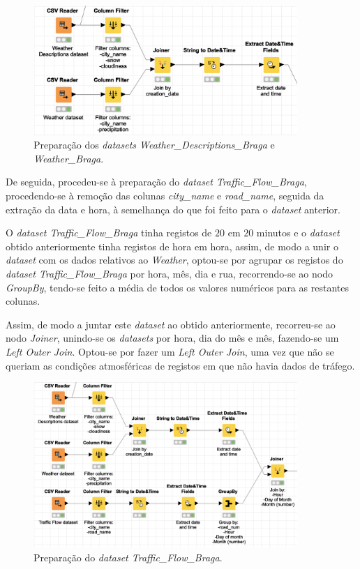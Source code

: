 \documentclass[a4paper, 12pt]{article}
\begin{document}
\begin{figure}[H]
	\centering
	\includegraphics[width=10cm]{weather}
	\caption{Preparação dos \textit{datasets Weather\_Descriptions\_Braga} e \textit{Weather\_Braga}.}
\end{figure}

De seguida, procedeu-se à preparação do \textit{dataset Traffic\_Flow\_Braga}, procedendo-se à remoção das colunas \textit{city\_name} e \textit{road\_name}, seguida da extração da data e hora, à semelhança do que foi feito para o \textit{dataset} anterior.

O \textit{dataset Traffic\_Flow\_Braga} tinha registos de $20$ em $20$ minutos e o \textit{dataset} obtido anteriormente tinha registos de hora em hora, assim, de modo a unir o \textit{dataset} com os dados relativos ao \textit{Weather}, optou-se por agrupar os registos do \textit{dataset Traffic\_Flow\_Braga} por hora, mês, dia e rua, recorrendo-se ao nodo \textit{GroupBy}, tendo-se feito a média de todos os valores numéricos para as restantes colunas.

Assim, de modo a juntar este \textit{dataset} ao obtido anteriormente, recorreu-se ao nodo \textit{Joiner}, unindo-se os \textit{datasets} por hora, dia do mês e mês, fazendo-se um \textit{Left Outer Join}. Optou-se por fazer um \textit{Left Outer Join}, uma vez que não se queriam as condições atmosféricas de registos em que não havia dados de tráfego.

\begin{figure}[H]
	\centering
	\includegraphics[width=10cm]{join}
	\caption{Preparação do \textit{dataset Traffic\_Flow\_Braga}.}
\end{figure}
\end{document}
